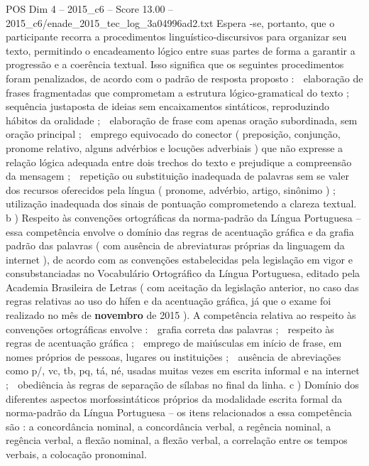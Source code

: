 \begin{textsample}{POS Dim 4 – 2015\_c6 – Score 13.00 – 2015\_c6/enade\_2015\_tec\_log\_3a04996ad2.txt}
Espera -se, portanto, que o participante recorra a procedimentos linguístico-discursivos para organizar seu texto, permitindo o encadeamento lógico entre suas partes de forma a garantir a progressão e a coerência textual.
Isso significa que os seguintes procedimentos foram penalizados, de acordo com o padrão de resposta proposto :  elaboração de frases fragmentadas que comprometam a estrutura lógico-gramatical do texto ;  sequência justaposta de ideias sem encaixamentos sintáticos, reproduzindo hábitos da oralidade ;  elaboração de frase com apenas oração subordinada, sem oração principal ;  emprego equivocado do conector ( preposição, conjunção, pronome relativo, alguns advérbios e locuções adverbiais ) que não expresse a relação lógica adequada entre dois trechos do texto e prejudique a compreensão da mensagem ;  repetição ou substituição inadequada de palavras sem se valer dos recursos oferecidos pela língua ( pronome, advérbio, artigo, sinônimo ) ;  utilização inadequada dos sinais de pontuação comprometendo a clareza textual. b ) Respeito às convenções ortográficas da norma-padrão da Língua Portuguesa – essa competência envolve o domínio das regras de acentuação gráfica e da grafia padrão das palavras ( com ausência de abreviaturas próprias da linguagem da internet ), de acordo com as convenções estabelecidas pela legislação em vigor e consubstanciadas no Vocabulário Ortográfico da Língua Portuguesa, editado pela Academia Brasileira de Letras ( com aceitação da legislação anterior, no caso das regras relativas ao uso do hífen e da acentuação gráfica, já que o exame foi realizado no mês de \textbf{novembro} de 2015 ).
A competência relativa ao respeito às convenções ortográficas envolve :  grafia correta das palavras ;  respeito às regras de acentuação gráfica ;  emprego de maiúsculas em início de frase, em nomes próprios de pessoas, lugares ou instituições ;  ausência de abreviações como p/, vc, tb, pq, tá, né, usadas muitas vezes em escrita informal e na internet ;  obediência às regras de separação de sílabas no final da linha. c ) Domínio dos diferentes aspectos morfossintáticos próprios da modalidade escrita formal da norma-padrão da Língua Portuguesa – os itens relacionados a essa competência são : a concordância nominal, a concordância verbal, a regência nominal, a regência verbal, a flexão nominal, a flexão verbal, a correlação entre os tempos verbais, a colocação pronominal.

\end{textsample}
